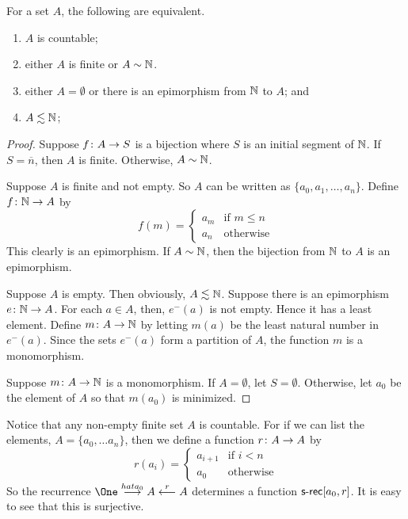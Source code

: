 \begin{theorem}
	For a set $A$, the following are equivalent.
	\begin{enumerate}
		\item $A$ is countable;
		\item either $A$ is finite or $A\sim \mathbb N$. 
		\item either $A=\emptyset$ or there is an epimorphism from $\mathbb N$ to $A$; and
		\item $A\lesssim\mathbb N$;
	\end{enumerate}
	
	\begin{proof}
		Suppose ${f}\colon{A}\to{S}$ is a bijection where $S$ is an initial segment of $\mathbb N$. If $S=\overline n$, then $A$ is finite. Otherwise, $A\sim \mathbb N$.
		
		Suppose $A$ is finite and not empty. So $A$ can be written as $\{a_0,a_1,\ldots,a_n\}$. Define ${f}\colon{\mathbb N}\to{A}$ by 
		\[f(m) = \begin{cases}
		 a_m&\text{if $m\leq n$}\\
		 a_n&\text{otherwise}
		\end{cases}
		\]
		This clearly is an epimorphism. If $A\sim\mathbb N$, then the bijection from $\mathbb N$ to $A$ is an epimorphism.
		
		Suppose $A$ is empty. Then obviously, $A\lesssim \mathbb N$. Suppose there is an epimorphism ${e}\colon{\mathbb N}\to{A}$. For each $a\in A$, then, $e^-(a)$ is not empty. Hence it has a least element. Define ${m}\colon{A}\to{\mathbb N}$ by letting $m(a)$ be the least natural number in $e^-(a)$. Since the sets $e^-(a)$ form a partition of $A$, the function $m$ is a monomorphism.
		
		Suppose ${m}\colon{A}\to{\mathbb N}$ is a monomorphism. If $A=\emptyset$, let $S=\emptyset$. Otherwise, let $a_0$ be the element of $A$ so that $m(a_0)$ is minimized.  
	\end{proof}
	
\end{theorem}

Notice that any non-empty finite set $A$ is countable. For if we can list the elements,
$A = \{a_0,\ldots a_n\}$, then we define a function ${r}\colon{A}\to{A}$ by
\[r(a_i) = \begin{cases}
a_{i+1} & \text{if $i<n$}\\
a_0     &\text{otherwise}
\end{cases}\]
So the recurrence $\One\stackrel{hat{a_0}}{\longrightarrow}A\stackrel{r}{\longleftarrow}A$ determines a function $\mathord{\textsf{s-rec}}[a_0,r]$. 
It is easy to see that this is surjective.

